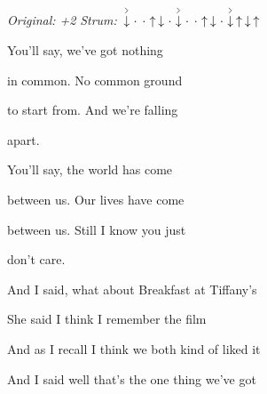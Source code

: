 \begin{song}


\begin{headerbox}
\RaiseBoxWithAccents
{} \quad
\textit{Original: +2} \quad
\textit{Strum:} $\AccentDown\Miss\Miss\Up\Down\Miss\AccentDown\Miss\Miss\Up\Down\Miss\AccentDown\Up\Down\Up$
\end{headerbox}

\begin{vchordbox}
\vspace{3ex}
\end{vchordbox}

\Large

\bigskip

\Intro {}   

\bigskip

You'll say, we've got nothing \par
in common. No common ground \par
to start from. And we're falling \par
apart.   \par

\bigskip

You'll say, the world has come \par
between us. Our lives have come \par
between us. Still I know you just \par
don't care.   \par

\bigskip

\begin{chorusbox}{\Chorus}
And I said, what about Breakfast at Tiffany's \par
She said I think I remember the film \par
And as I recall I think we both kind of liked it \par
And I said well that's the one thing we've got \par
\end{chorusbox}


\end{song}
